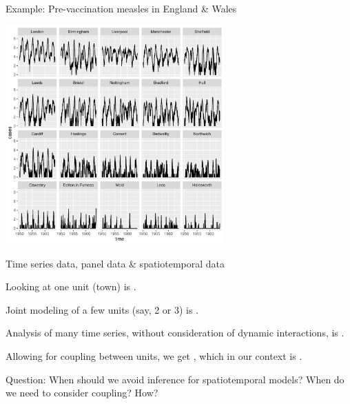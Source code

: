\documentclass{beamer}
\begin{document}
\begin{frame}{Example: Pre-vaccination measles in England \& Wales}

\vspace{-2mm}

\begin{center}
\includegraphics[width=8.4cm]{he10-data.pdf}


\end{center}

\vspace{-2mm}
  
\end{frame}

\begin{frame}{Time series data, panel data \& spatiotemporal data}

  \bi
\item Looking at one unit (town) is .

  \item Joint modeling of a few units (say, 2 or 3) is .

\item Analysis of many time series, without consideration of dynamic interactions, is .

\item Allowing for coupling between units, we get , which in our context is .

  \ei

\vspace{3mm}
  
Question: When should we avoid inference for spatiotemporal models? When do we need to consider coupling? How?

\end{frame}
\end{document}
